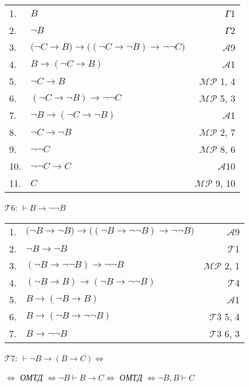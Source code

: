 \documentclass{article}
\begin{document}
\begin{enumerate}
\begin{tabular}{llr}
1. & $B$ & \textit{Г}1\\
2. & $\neg B$ & \textit{Г}2\\
3. & $\bigl(\neg C\rightarrow B\bigr)\rightarrow\bigl(\left(\neg C\rightarrow\neg B\right)\rightarrow\neg\neg C\bigr)$ & $\mathcal{A}$9\\
4. & $B\rightarrow\left(\neg C\rightarrow B\right)$ & $\mathcal{A}$1\\
5. & $\neg C\rightarrow B$ & $\mathcal{MP}$ 1, 4\\
6. & $\left(\neg C\rightarrow\neg B\right)\rightarrow\neg\neg C$ & $\mathcal{MP}$ 5, 3\\
7. & $\neg B\rightarrow\left(\neg C\rightarrow\neg B\right)$ & $\mathcal{A}$1\\
8. & $\neg C\rightarrow\neg B$ & $\mathcal{MP}$ 2, 7\\
9. & $\neg\neg C$ & $\mathcal{MP}$ 8, 6\\
10. & $\neg\neg C\rightarrow C$ & $\mathcal{A}$10\\
11. & $C$ & $\mathcal{MP}$ 9, 10
\end{tabular}
\item[$\mathcal{T}$6:] $\vdash B\rightarrow\neg\neg B$

\begin{tabular}{llr}
1. & $\bigl(\neg B\rightarrow\neg B\bigr)\rightarrow\bigl(\left(\neg B\rightarrow\neg\neg B\right)\rightarrow\neg\neg B\bigr)$ & $\mathcal{A}$9\\
2. & $\neg B\rightarrow\neg B$ & $\mathcal{T}$1\\
3. & $\left(\neg B\rightarrow\neg\neg B\right)\rightarrow\neg\neg B$ & $\mathcal{MP}$ 2, 1\\
4. & $\left(\neg B\rightarrow B\right)\rightarrow\left(\neg B\rightarrow\neg\neg B\right)$ & $\mathcal{T}$4\\
5. & $B\rightarrow\left(\neg B\rightarrow B\right)$ & $\mathcal{A}$1\\
6. & $B\rightarrow\left(\neg B\rightarrow\neg\neg B\right)$ & $\mathcal{T}$3 5, 4\\
7. & $B\rightarrow\neg\neg B$ & $\mathcal{T}$3 6, 3
\end{tabular}
\item[$\mathcal{T}$7:] $\vdash\neg B\rightarrow\left(B\rightarrow C\right)\Leftrightarrow$

$\Leftrightarrow$ \textit{ОМТД} $\Leftrightarrow\neg B\vdash B\rightarrow C\Leftrightarrow$ \textit{ОМТД} $\Leftrightarrow\neg B, B\vdash C$


\end{enumerate}
\end{document}

